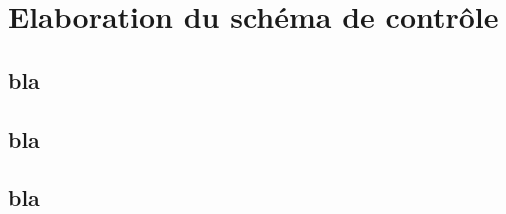 \section{Elaboration du sch\'ema de contr\^ole}

\subsection{bla}

\subsection{bla}

\subsection{bla}


 